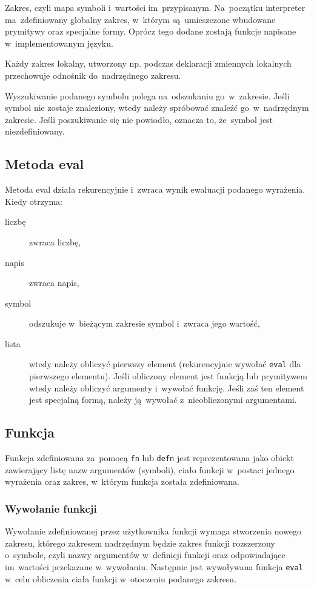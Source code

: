 \documentclass[a4paper,11pt]{article}
\begin{document}
Zakres, czyli mapa symboli i~wartości im~przypisanym. Na~początku interpreter
ma~zdefiniowany globalny zakres, w~którym są~umieszczone wbudowane prymitywy
oraz specjalne formy. Oprócz tego dodane zostają funkcje napisane
w~implementowanym języku.

Każdy zakres lokalny, utworzony np. podczas deklaracji zmiennych lokalnych
przechowuje odnośnik do~nadrzędnego zakresu.

Wyszukiwanie podanego symbolu polega na~odszukaniu go~w~zakresie. Jeśli symbol
nie zostaje znaleziony, wtedy należy spróbować znaleźć go~w~nadrzędnym
zakresie. Jeśli poszukiwanie się nie powiodło, oznacza to, że~symbol jest
niezdefiniowany.

\subsection{Metoda eval}

Metoda eval działa rekurencyjnie i~zwraca wynik ewaluacji podanego wyrażenia.
Kiedy otrzyma:
\begin{description}
\item[liczbę] zwraca liczbę,
\item[napis] zwraca napis,
\item[symbol] odszukuje w~bieżącym zakresie symbol i~zwraca jego wartość,
\item[lista] wtedy należy obliczyć pierwszy element (rekurencyjnie wywołać
  \verb+eval+ dla pierwszego elementu). Jeśli obliczony element jest funkcją
  lub prymitywem wtedy należy obliczyć argumenty i~wywołać funkcję. Jeśli zaś
  ten element jest specjalną formą, należy ją~wywołać z~nieobliczonymi
  argumentami.
\end{description}

\subsection{Funkcja}

Funkcja zdefiniowana za~pomocą \verb+fn+ lub \verb+defn+ jest reprezentowana
jako obiekt zawierający listę nazw argumentów (symboli), ciało funkcji
w~postaci jednego wyrażenia oraz zakres, w~którym funkcja została zdefiniowana.

\subsubsection{Wywołanie funkcji}

Wywołanie zdefiniowanej przez użytkownika funkcji wymaga stworzenia nowego
zakresu, którego zakresem nadrzędnym będzie zakres funkcji rozszerzony
o~symbole, czyli nazwy argumentów w~definicji funkcji oraz odpowiadające
im~wartości przekazane w~wywołaniu. Następnie jest wywoływana funkcja
\verb+eval+ w~celu obliczenia ciała funkcji w~otoczeniu podanego zakresu.
\end{document}
